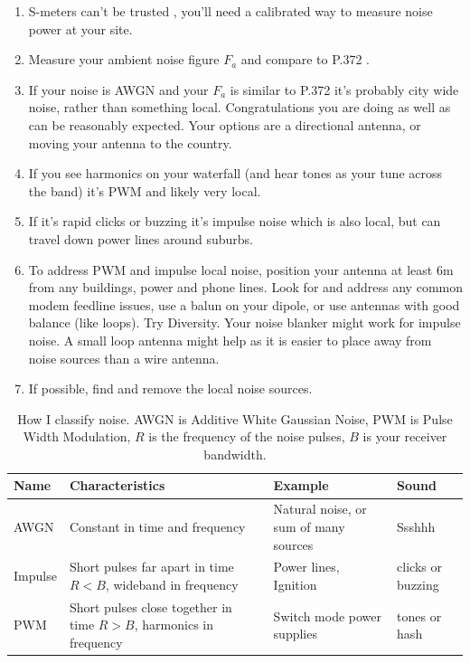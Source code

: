 \documentclass{article}
\begin{document}
\begin{enumerate}
\item S-meters can't be trusted \cite{vu2nsb_s_meter}, you'll need a calibrated way to measure noise power at your site.
\item Measure your ambient noise figure $F_a$ and compare to P.372 \cite{itu372-16}.
\item If your noise is AWGN and your $F_a$ is similar to P.372 it's probably city wide noise, rather than something local. Congratulations you are doing as well as can be reasonably expected. Your options are a directional antenna, or moving your antenna to the country.
\item If you see harmonics on your waterfall (and hear tones as your tune across the band) it's PWM and likely very local.
\item If it's rapid clicks or buzzing it's impulse noise which is also local, but can travel down power lines around suburbs. 
\item To address PWM and impulse local noise, position your antenna at least 6m from any buildings, power and phone lines.  Look for and address any common modem feedline issues, use a balun on your dipole, or use antennas with good balance (like loops).  Try Diversity.  Your noise blanker might work for impulse noise.  A small loop antenna might help as it is easier to place away from noise sources than a wire antenna.
\item If possible, find and remove the local noise sources.
\end{enumerate}

\begin{table}[h]
\centering
\begin{tabular}{ | m{1.2cm} | m{4cm} | m{3cm} | m{2cm} |}
 \hline\hline
 Name & Characteristics & Example & Sound \\
 \hline
 AWGN & Constant in time and frequency & Natural noise, or sum of many sources & Ssshhh \\
 \hline
 Impulse & Short pulses far apart in time $R<B$, wideband in frequency & Power lines, Ignition & clicks or buzzing \\
\hline PWM & Short pulses close together in time $R>B$, harmonics in frequency & Switch mode power supplies & tones or hash \\
 \hline
\end{tabular}
\caption{How I classify noise. AWGN is Additive White Gaussian Noise, PWM is Pulse Width Modulation, $R$ is the frequency of the noise pulses, $B$ is your receiver bandwidth.}
\label{table:noise_classes}
\end{table}
\end{document}
